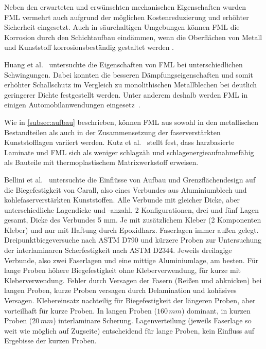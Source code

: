 Neben den erwarteten und erwünschten mechanischen Eigenschaften wurden FML vermehrt auch aufgrund der möglichen Kostenreduzierung und erhöhter Sicherheit eingesetzt.
Auch in säurehaltigen Umgebungen können FML die Korrosion durch den Schichtaufbau eindämmen, wenn die Oberflächen von Metall und Kunststoff korrosionsbeständig gestaltet werden \cite{Vogelesang.2000}.


Huang et al.~\cite{Huang.1995} untersuchte die Eigenschaften von FML bei unterschiedlichen Schwingungen.
Dabei konnten die besseren Dämpfungseigenschaften und somit erhöhter Schallschutz im Vergleich zu monolithischen Metallblechen bei deutlich geringerer Dichte festgestellt werden.
Unter anderem deshalb werden FML in einigen Automobilanwendungen eingesetz~\cite{Ruokolainen.2008}.

Wie in \autoref{subsec:aufbau} beschrieben, können FML aus sowohl in den metallischen Bestandteilen als auch in der Zusammensetzung der faserverstärkten Kunststofflagen variiert werden.
Kutz et al.~\cite{Kutz.2017} stellt fest, dass harzbasierte Laminate und FML sich als weniger schlagzäh und schlagenergieaufnahmefähig als Bauteile mit thermoplastischem Matrixwerkstoff erweisen.


Bellini et al.~\cite{Bellini.2020} untersuchte die Einflüsse von Aufbau und Grenzflächendesign auf die Biegefestigkeit von Carall, also eines Verbundes aus Aluminiumblech und kohlefaserverstärkten Kunststoffen.
Alle Verbunde mit gleicher Dicke, aber unterschiedliche Lagendicke und -anzahl.
2 Konfigurationen, drei und fünf Lagen gesamt, Dicke des Verbundes 5 mm.
Je mit zusätzlichem Kleber (2 Komponenten Kleber) und nur mit Haftung durch Epoxidharz.
Faserlagen immer außen gelegt.
Dreipunktbiegeversuche nach ASTM D790 und kürzere Proben zur Untersuchung der interlaminaren Scherfestigkeit nach ASTM D2344.
Jeweils dreilagige Verbunde, also zwei Faserlagen und eine mittige Aluminiumlage, am besten.
Für lange Proben höhere Biegefestigkeit ohne Kleberverwendung, für kurze mit Kleberverwendung.
Fehler durch Versagen der Fasern (Reißen und abknicken) bei langen Proben, kurze Proben versagen durch Delamination und kohäsives Versagen.
Klebereinsatz nachteilig für Biegefestigkeit der längeren Proben, aber vorteilhaft für kurze Proben.
In langen Proben ($160\, mm$) dominant, in kurzen Proben ($20\, mm$) interlaminare Scherung.
Lagenverteilung (jeweils Faserlage so weit wie möglich auf Zugseite) entscheidend für lange Proben, kein Einfluss auf Ergebisse der kurzen Proben.


